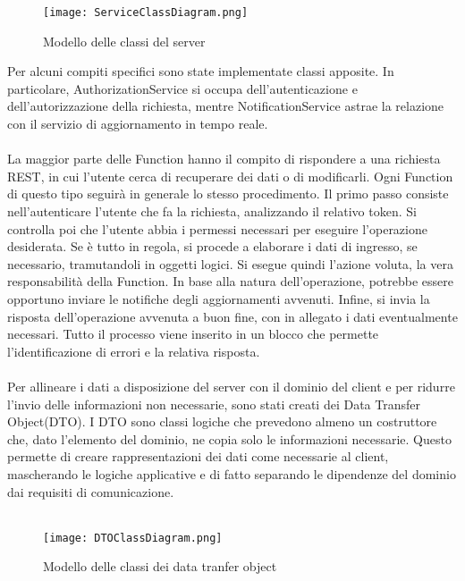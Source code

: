 \begin{figure}[h!]
    \begin{center}
        \texttt{[image: ServiceClassDiagram.png]}
        \caption{Modello delle classi del server}
    \end{center}
\end{figure}
Per alcuni compiti specifici sono state implementate classi apposite.
In particolare, AuthorizationService si occupa dell'autenticazione e dell'autorizzazione della richiesta,
mentre NotificationService astrae la relazione con il servizio di aggiornamento in tempo reale.\\
\\
La maggior parte delle Function hanno il compito di rispondere a una richiesta REST, 
in cui l'utente cerca di recuperare dei dati o di modificarli.
Ogni Function di questo tipo seguirà in generale lo stesso procedimento.
Il primo passo consiste nell'autenticare l'utente che fa la richiesta,
analizzando il relativo token.
Si controlla poi che l'utente abbia i permessi necessari per eseguire l'operazione desiderata.
Se è tutto in regola, si procede a elaborare i dati di ingresso, se necessario, 
tramutandoli in oggetti logici.
Si esegue quindi l'azione voluta, la vera responsabilità della Function.
In base alla natura dell'operazione, 
potrebbe essere opportuno inviare le notifiche degli aggiornamenti avvenuti.
Infine, si invia la risposta dell'operazione avvenuta a buon fine, 
con in allegato i dati eventualmente necessari.
Tutto il processo viene inserito in un blocco che permette l'identificazione di errori e
la relativa risposta.\\
\\
Per allineare i dati a disposizione del server con il dominio del client
e per ridurre l'invio delle informazioni non necessarie, sono stati creati dei Data Transfer Object(DTO).
I DTO sono classi logiche che prevedono almeno un costruttore che, dato l'elemento del dominio, 
ne copia solo le informazioni necessarie. 
Questo permette di creare rappresentazioni dei dati come necessarie al client,
mascherando le logiche applicative e di fatto separando le dipendenze del dominio dai requisiti di comunicazione.\\
\\
\begin{figure}[h!]
    \begin{center}
        \texttt{[image: DTOClassDiagram.png]}
        \caption{Modello delle classi dei data tranfer object}
    \end{center}
\end{figure}

